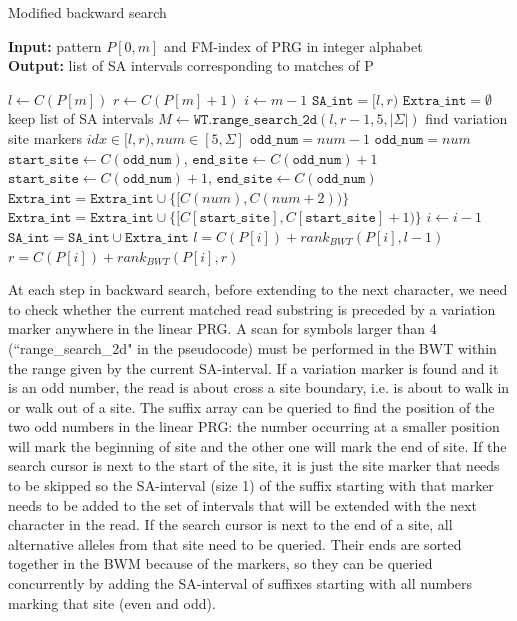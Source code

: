 \documentclass[runningheads,a4paper]{llncs}
\begin{document}
\begin{algorithm}
\caption{Modified backward search} \label{bsearch}
\textbf{Input:} \textrm{pattern} $P[0,m]$ \textrm{and FM-index of PRG in integer alphabet}\\
\textbf{Output:} \textrm{list of SA intervals corresponding to matches of P} 
\begin{algorithmic}[1]
\State $l \gets C(P[m])$
\State $r \gets C(P[m]+1)$
\State $i \gets m-1$
\State $\texttt{SA\char`_int}={[l,r)}$
\State $\texttt{Extra\char`_int}=\emptyset$   \Comment keep list of SA intervals
\ForAll {$[l,r) \in \texttt{SA\char`_int}$} 
\State $M \gets \texttt{WT.range\char`_search\char`_2d} (l,r-1,5,|\Sigma|)$ \Comment find variation site markers
  \Comment $ idx\in [l,r), num\in[5,\Sigma]$
\State $\texttt{odd\char`_num}=num-1$
\Else
\State $\texttt{odd\char`_num}=num$
\EndIf
{}
\State $\texttt{start\char`_site} \gets C(\texttt{odd\char`_num})$, $\texttt{end\char`_site} \gets C(\texttt{odd\char`_num})+1$
\Else 
\State $\texttt{start\char`_site} \gets C(\texttt{odd\char`_num})+1$, $\texttt{end\char`_site} \gets C(\texttt{odd\char`_num})$
\EndIf
{}
\State $\texttt{Extra\char`_int}=\texttt{Extra\char`_int} \cup \{[C(num),C(num+2))\}$
\Else
\State $\texttt{Extra\char`_int}=\texttt{Extra\char`_int} \cup \{[C[\texttt{start\char`_site}], C[\texttt{start\char`_site}]+1)\}$
\EndIf
\EndFor
\EndFor
\State $i \gets i-1$
\State $\texttt{SA\char`_int}=\texttt{SA\char`_int} \cup \texttt{Extra\char`_int}$
\ForAll {$[l,r) \in \texttt{SA\char`_int}$} 
\State $l=C(P[i])+rank_{BWT}(P[i],l-1)$
\State $r=C(P[i])+rank_{BWT}(P[i],r)$
\EndFor
\EndWhile
\end {algorithmic}
\end{algorithm}


At each step in backward search, before extending to the next character, we need to check whether the current matched read substring is preceded by a variation marker anywhere in the linear PRG. A scan for symbols larger than 4 (``range\_search\_2d" in the pseudocode) must be performed in the BWT within the range given by the current SA-interval. If a variation marker is found and it is an odd number, the read is about cross a site boundary, i.e. is about to walk in or walk out of a site. The suffix array can be queried to find the position of the two odd numbers in the linear PRG: the number occurring at a smaller position will mark the beginning of site and the other one will mark the end of site. If the search cursor is next to the start of the site, it is just the site marker that needs to be skipped so the SA-interval (size 1) of the suffix starting with that marker needs to be added to the set of intervals that will be extended with the next character in the read. If the search cursor is next to the end of a site, all alternative alleles from that site need to be queried. Their ends are sorted together in the BWM because of the markers, so they can be queried concurrently by adding the SA-interval of suffixes starting with all numbers marking that site (even and odd). 
\end{document}
